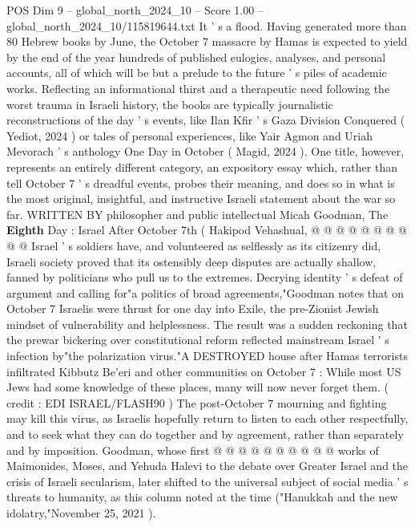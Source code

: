 \begin{textsample}{POS Dim 9 – global\_north\_2024\_10 – Score 1.00 – global\_north\_2024\_10/115819644.txt}  \label{ex:f9_pos_222}
It ' s a flood.
Having generated more than 80 Hebrew books by June, the October 7 massacre by Hamas is expected to yield by the end of the year hundreds of published eulogies, analyses, and personal accounts, all of which will be but a prelude to the future ' s piles of academic works.
Reflecting an informational thirst and a therapeutic need following the worst trauma in Israeli history, the books are typically journalistic reconstructions of the day ' s events, like Ilan Kfir ' s Gaza Division Conquered ( Yediot, 2024 ) or tales of personal experiences, like Yair Agmon and Uriah Mevorach ' s anthology One Day in October ( Magid, 2024 ).
One title, however, represents an entirely different category, an expository essay which, rather than tell October 7 ' s dreadful events, probes their meaning, and does so in what is the most original, insightful, and instructive Israeli statement about the war so far.
WRITTEN BY philosopher and public intellectual Micah Goodman, The \textbf{Eighth} Day : Israel After October 7th ( Hakipod Vehashual, @ @ @ @ @ @ @ @ @ @ Israel ' s soldiers have, and volunteered as selflessly as its citizenry did, Israeli society proved that its ostensibly deep disputes are actually shallow, fanned by politicians who pull us to the extremes.
Decrying identity ' s defeat of argument and calling for"a politics of broad agreements,"Goodman notes that on October 7 Israelis were thrust for one day into Exile, the pre-Zionist Jewish mindset of vulnerability and helplessness.
The result was a sudden reckoning that the prewar bickering over constitutional reform reflected mainstream Israel ' s infection by"the polarization virus."A DESTROYED house after Hamas terrorists infiltrated Kibbutz Be'eri and other communities on October 7 : While most US Jews had some knowledge of these places, many will now never forget them. ( credit : EDI ISRAEL/FLASH90 ) The post-October 7 mourning and fighting may kill this virus, as Israelis hopefully return to listen to each other respectfully, and to seek what they can do together and by agreement, rather than separately and by imposition.
Goodman, whose first @ @ @ @ @ @ @ @ @ @ works of Maimonides, Moses, and Yehuda Halevi to the debate over Greater Israel and the crisis of Israeli secularism, later shifted to the universal subject of social media ' s threats to humanity, as this column noted at the time ("Hanukkah and the new idolatry,"November 25, 2021 ).

\end{textsample}

